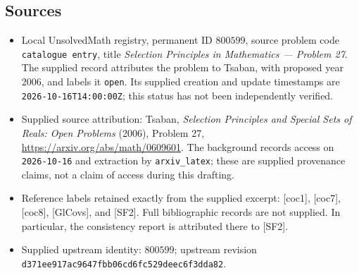 \documentclass[11pt]{article}
\begin{document}
\subsection{Sources}
\begin{itemize}
\item Local UnsolvedMath registry, permanent ID \(800599\), source problem code \texttt{catalogue entry}, title \emph{Selection Principles in Mathematics --- Problem 27}. The supplied record attributes the problem to Tsaban, with proposed year 2006, and labels it \texttt{open}. Its supplied creation and update timestamps are \texttt{2026-10-16T14:00:00Z}; this status has not been independently verified.
\item Supplied source attribution: Tsaban, \emph{Selection Principles and Special Sets of Reals: Open Problems} (2006), Problem 27, \url{https://arxiv.org/abs/math/0609601}. The background records access on \texttt{2026-10-16} and extraction by \texttt{arxiv\_latex}; these are supplied provenance claims, not a claim of access during this drafting.
\item Reference labels retained exactly from the supplied excerpt: [coc1], [coc7], [coc8], [GlCovs], and [SF2]. Full bibliographic records are not supplied. In particular, the consistency report is attributed there to [SF2].
\item Supplied upstream identity: \(800599\); upstream revision \texttt{d371ee917ac9647fbb06cd6fc529deec6f3dda82}.
\end{itemize}
\end{document}
